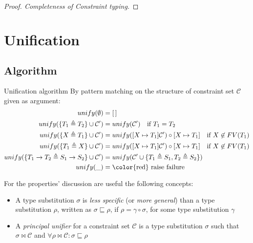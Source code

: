 \documentclass[8pt]{beamer}
\begin{document}
\begin{frame}
    \begin{proof}[Proof. Completeness of Constraint typing]
    \end{proof}
\end{frame}

\section{Unification}
\subsection{Algorithm}
\begin{frame}
    \begin{block}{Unification algorithm}
        By pattern matching on the structure of constraint set $\mathcal{C}$
        given as argument:
        \begin{displaymath}
            \begin{split}
                unify(\emptyset) &= [\,] \\
                unify(\{T_1 \triangleq T_2\} \cup \mathcal{C}^{\prime}) &=
                    unify(\mathcal{C}^{\prime})
                    \quad \text{if } T_1 = T_2\\
                unify(\{X \triangleq T_1\} \cup \mathcal{C}^{\prime}) &=
                    unify([ X \mapsto T_1]\mathcal{C}^{\prime}) \circ [X \mapsto T_1]
                    \quad \text{if } X \not \in FV(T_1)\\
                unify(\{T_1 \triangleq X\} \cup \mathcal{C}^{\prime}) &=
                    unify([ X \mapsto T_1]\mathcal{C}^{\prime}) \circ [X \mapsto T_1]
                    \quad \text{if } X \not \in FV(T_1)\\
                unify(\{T_1 \rightarrow T_2 \triangleq S_1\rightarrow S_2 \} 
                    \cup \mathcal{C}^{\prime}) &=
                    unify(\mathcal{C}^{\prime} \cup \{T_1 \triangleq S_1,
                        T_2 \triangleq S_2\}) \\
                unify(\_) &= \text{\color{red} raise failure}\\
            \end{split}
        \end{displaymath}
    \end{block}
    \pause
    For the properties' discussion are useful the following concepts:
    \begin{itemize}
        \item   A type substitution $\sigma$ is \emph{less specific} (or 
                \emph{more general}) than a type substitution $\rho$, written
                as $\sigma \sqsubseteq \rho$, if $\rho = \gamma \circ \sigma$,
                for some type substitution $\gamma$
        \item   A \emph{principal unifier} for a constraint set $\mathcal{C}$ 
                is a type substitution $\sigma$ such that $\sigma \Join \mathcal{C}$
                and $\forall \rho \Join \mathcal{C}: \sigma \sqsubseteq \rho$
    \end{itemize}
\end{frame}
\end{document}
